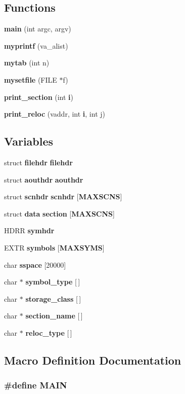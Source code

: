 \subsection*{Functions}
\begin{DoxyCompactItemize}
\item 
{\bf main} (int argc, argv)
\item 
{\bf myprintf} (va\+\_\+alist)
\item 
{\bf mytab} (int n)
\item 
{\bf mysetfile} (F\+I\+LE $\ast$f)
\item 
{\bf print\+\_\+section} (int {\bf i})
\item 
{\bf print\+\_\+reloc} (vaddr, int {\bf i}, int j)
\end{DoxyCompactItemize}
\subsection*{Variables}
\begin{DoxyCompactItemize}
\item 
struct {\bf filehdr} {\bf filehdr}
\item 
struct {\bf aouthdr} {\bf aouthdr}
\item 
struct {\bf scnhdr} {\bf scnhdr} [{\bf M\+A\+X\+S\+C\+NS}]
\item 
struct {\bf data} {\bf section} [{\bf M\+A\+X\+S\+C\+NS}]
\item 
H\+D\+RR {\bf symhdr}
\item 
E\+X\+TR {\bf symbols} [{\bf M\+A\+X\+S\+Y\+MS}]
\item 
char {\bf sspace} [20000]
\item 
char $\ast$ {\bf symbol\+\_\+type} [$\,$]
\item 
char $\ast$ {\bf storage\+\_\+class} [$\,$]
\item 
char $\ast$ {\bf section\+\_\+name} [$\,$]
\item 
char $\ast$ {\bf reloc\+\_\+type} [$\,$]
\end{DoxyCompactItemize}


\subsection{Macro Definition Documentation}
\subsubsection[{M\+A\+IN}]{\setlength{\rightskip}{0pt plus 5cm}\#define M\+A\+IN}\label{out_8c_a34b04bd23b07b485921a728ad0805ac4}


